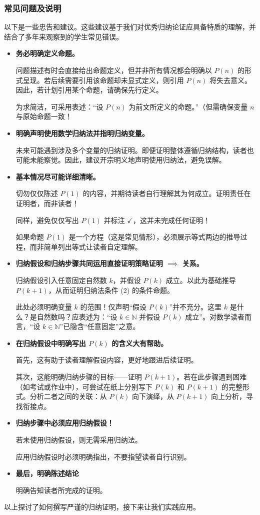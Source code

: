 \subsubsection*{常见问题及说明}

以下是一些忠告和建议。这些建议基于我们对优秀归纳论证应具备特质的理解，并结合了多年来观察到的学生常见错误。

\begin{itemize}
    \item \textbf{务必明确定义命题。}
    
    问题描述有时会直接给出命题定义，但并非所有情况都会明确以 $P(n)$ 的形式呈现。若后续需要引用该命题却未显式定义，则引用 $P(n)$ 将失去意义。因此，若计划引用某个命题，请确保先行定义。

    为求简洁，可采用表述：``设 $P(n)$ 为前文所定义的命题。''（但需确保变量 $n$ 与原始命题一致！

    \item \textbf{明确声明使用数学归纳法并指明归纳变量。}
    
    未来可能遇到涉及多个变量的归纳证明。即便证明整体遵循归纳结构，读者也可能未能察觉。因此，建议开宗明义地声明使用归纳法，避免误解。

    \item \textbf{基本情况尽可能详细清晰。}
    
    切勿仅仅陈述 $P(1)$ 的内容，并期待读者自行理解其为何成立。证明责任在证明者，而非读者！

    同样，避免仅仅写出 $P(1)$ 并标注 $\checkmark$，这并未完成任何证明！

    如果命题 $P(1)$ 是一个方程（这是常见情形），必须展示等式两边的推导过程，而非简单列出等式让读者自定理解。

    \item \textbf{归纳假设和归纳步骤共同运用直接证明策略证明 $\implies$ 关系。}
    
    归纳假设引入任意固定自然数 $k$，并假设 $P(k)$ 成立。以此为基础推导 $P(k+1)$，从而证明归纳法条件 (2) 的条件命题。

    此处必须明确变量 $k$ 的范围！仅声明``假设 $P(k)$''并不充分。这里 $k$ 是什么？是自然数吗？应表述为：``设 $k \in \mathbb{N}$ 并假设 $P(k)$ 成立''。对数学读者而言，``设 $k \in \mathbb{N}$''已隐含``任意固定''之意。

    \item \textbf{在归纳假设中明确写出 $P(k)$ 的含义大有帮助。}
    
    首先，这有助于读者理解假设内容，更好地跟进后续证明。

    其次，这能明确归纳步骤的目标——证明 $P(k+1)$。若在此步骤遇到困难（如考试或作业中），可尝试在纸上分别写下 $P(k)$ 和 $P(k+1)$ 的完整形式。分析二者之间的关联：从 $P(k)$ 向下演绎，从 $P(k+1)$ 向上分析，寻找衔接点。

    \item \textbf{归纳步骤中必须应用归纳假设！}
    
    若未使用归纳假设，则无需采用归纳法。

    应用归纳假设时必须明确指出，不要指望读者自行识别。

    \item \textbf{最后，明确陈述结论}
    
    明确告知读者所完成的证明。\\
\end{itemize}

以上探讨了如何撰写严谨的归纳证明，接下来让我们实践应用。
